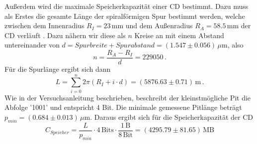         Außerdem wird die maximale Speicherkapazität einer CD bestimmt. Dazu muss als Erstes die gesamte Länge der spiralförmigen Spur bestimmt werden, welche zwischen dem Innenradius $R_I=23\,\text{mm}$ und dem Außenradius $R_A=58.5\,\text{mm}$ der CD verläuft \cite{RadiusCD}. Dazu nähern wir diese als $n$ Kreise an mit einem Abstand untereinander von $d=Spurbreite+Spurabstand=(1.547\pm 0.056)\,\mu\text{m}$, also
        \begin{equation}
            n=\frac{R_A-R_I}{d}=229050 \, .
        \end{equation}
        Für die Spurlänge ergibt sich dann
        \begin{equation}
            L = \sum_{i=0}^{n} 2\pi\left(R_I+i\cdot d\right) = (5876.63 \pm 0.71) \, \text{m} \, .
        \end{equation}
        Wie in der Versuchsanleitung beschrieben, beschreibt der kleinstmögliche Pit die Abfolge '1001' und entspricht 4 Bit. Die minimale gemessene Pitlänge beträgt $p_{min}=(0.684\pm 0.013)\,\mu\text{m}$. Daraus ergibt sich für die Speicherkapazität der CD
        \begin{equation}
            C_{Speicher} = \frac{L}{p_{min}}\cdot 4\,\text{Bits} \cdot \frac{1\,\text{B}}{8\,\text{Bit}} = (4295.79\pm 81.65)\,\text{MB}
        \end{equation}
        \FloatBarrier
